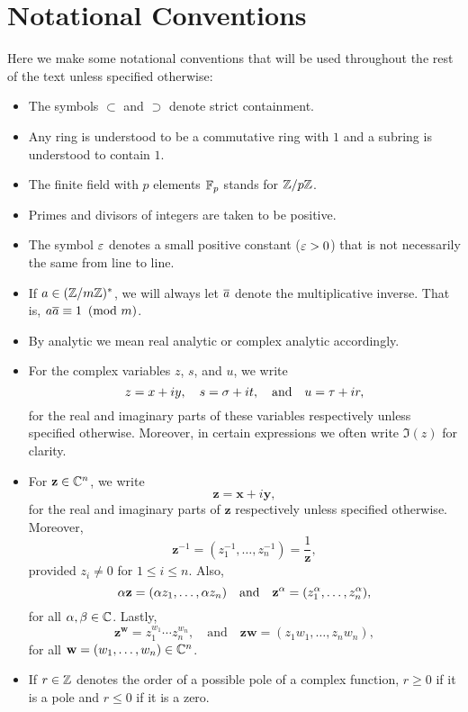   \section{Notational Conventions}
    Here we make some notational conventions that will be used throughout the rest of the text unless specified otherwise:
    \begin{itemize}
      \item The symbols $\subset$ and $\supset$ denote strict containment.
      \item Any ring is understood to be a commutative ring with $1$ and a subring is understood to contain $1$.
      \item The finite field with $p$ elements $\mathbb{F}_{p}$ stands for $\mathbb{Z}/p\mathbb{Z}$.
      \item Primes and divisors of integers are taken to be positive.
      \item The symbol $\varepsilon$ denotes a small positive constant ($\varepsilon > 0$) that is not necessarily the same from line to line.
      \item If $a \in (\mathbb{Z}/m\mathbb{Z})^{\ast}$, we will always let $\overline{a}$ denote the multiplicative inverse. That is, $a\overline{a} \equiv 1 \ \left(\text{mod }m\right)$.
      \item By analytic we mean real analytic or complex analytic accordingly.
      \item For the complex variables $z$, $s$, and $u$, we write
      \[
        z = x+iy, \quad s = \sigma+it, \quad \text{and} \quad u = \tau+ir,
      \]
      for the real and imaginary parts of these variables respectively unless specified otherwise. Moreover, in certain expressions we often write $\Im(z)$ for clarity.
      \item For $\mathbf{z} \in \mathbb{C}^{n}$, we write
      \[
        \mathbf{z} = \mathbf{x}+i\mathbf{y},
      \]
      for the real and imaginary parts of $\mathbf{z}$ respectively unless specified otherwise. Moreover,
      \[
        \mathbf{z}^{-1} = (z_{1}^{-1},\ldots,z_{n}^{-1}) = \frac{1}{\mathbf{z}},
      \]
      provided $z_{i} \neq 0$ for $1 \le i \le n$. Also,
      \[
        \alpha\mathbf{z} = (\alpha z_{1},\ldots,\alpha z_{n}) \quad \text{and} \quad \mathbf{z}^{\alpha} = (z_{1}^{\alpha},\ldots,z_{n}^{\alpha}),
      \]
      for all $\alpha,\beta \in \mathbb{C}$. Lastly,
      \[
        \mathbf{z}^{\mathbf{w}} = z_{1}^{w_{1}} \cdots z_{n}^{w_{n}}, \quad \text{and} \quad \mathbf{z}\mathbf{w} = (z_{1}w_{1},\ldots,z_{n}w_{n}),
      \]
      for all $\mathbf{w} = (w_{1},\ldots,w_{n}) \in \mathbb{C}^{n}$.
      \item If $r \in \mathbb{Z}$ denotes the order of a possible pole of a complex function, $r \ge 0$ if it is a pole and $r \le 0$ if it is a zero.

\end{itemize}
